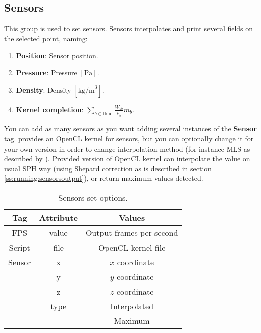 \subsection{Sensors}
\label{sss:XML:Sensors}
%
This group is used to set sensors. Sensors interpolates and print several
fields on the selected point, naming:
%
\begin{enumerate}
	\item \textbf{Position}: Sensor position.
	\item \textbf{Pressure}: Pressure $[\mbox{Pa}]$.
	\item \textbf{Density}: Density $[\mbox{kg/m}^3]$.
	\item \textbf{Kernel completion}: $\sum\limits_{b \in \mathrm{fluid}} \frac{W_{ab}}{\rho_b}m_b$.
\end{enumerate}
%
You can add as many sensors as you want adding several instances of the
\textbf{Sensor} tag. \NAME provides an OpenCL kernel for sensors, but you can
optionally change it for your own version in order to change interpolation
method (for instance MLS as described by \citet{colagrossi2003}). Provided
version of OpenCL kernel can interpolate the value on usual SPH way (using
Shepard correction as is described in section \ref{ss:running:sensorsoutput}),
or return maximum values detected.
%
\begin{table}[h!b!p!]\small
	\centering
	\begin{tabular}{| c | c | c | }
		\hline
		\cellcolor[rgb]{0.7,0.7,0.7}Tag & \cellcolor[rgb]{0.7,0.7,0.7}Attribute & \cellcolor[rgb]{0.7,0.7,0.7}Values \\
		\hline
		FPS    & value & Output frames per second \\
		\hline
		Script & file  & OpenCL kernel file \\
		\hline
		Sensor & x     & $x$ coordinate \\
		\hline
		       & y     & $y$ coordinate \\
		\hline
		       & z     & $z$ coordinate \\
		\hline
		       & type  & Interpolated \\
		       &       & Maximum \\
		\hline
	\end{tabular}
	\caption{Sensors set options.}
	\label{tables:caseSetup:Sensors:Options}
\end{table}
%
